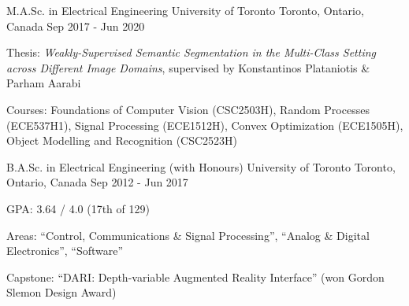 

\begin{cventries}

	\cventry
		{M.A.Sc. in Electrical Engineering} %
    {University of Toronto} %
    {Toronto, Ontario, Canada} %
    {Sep 2017 - Jun 2020} %
    {
				\item{Thesis: \emph{Weakly-Supervised Semantic Segmentation in the Multi-Class Setting across Different Image Domains}, supervised by Konstantinos Plataniotis \& Parham Aarabi}
				\item{Courses: Foundations of Computer Vision (CSC2503H), Random Processes (ECE537H1), Signal Processing (ECE1512H), Convex Optimization (ECE1505H), Object Modelling and Recognition (CSC2523H)}
		}

  \cventry
    {B.A.Sc. in Electrical Engineering (with Honours)} %
    {University of Toronto} %
    {Toronto, Ontario, Canada} %
    {Sep 2012 - Jun 2017} %
    {
      \begin{cvitems} %
				\item{GPA: 3.64 / 4.0 (17th of 129)}
				\item{Areas: ``Control, Communications \& Signal Processing'', ``Analog \& Digital Electronics'', ``Software''}
				\item{Capstone: ``DARI: Depth-variable Augmented Reality Interface'' (won Gordon Slemon Design Award)}
			\end{cvitems}
    }

\end{cventries}
